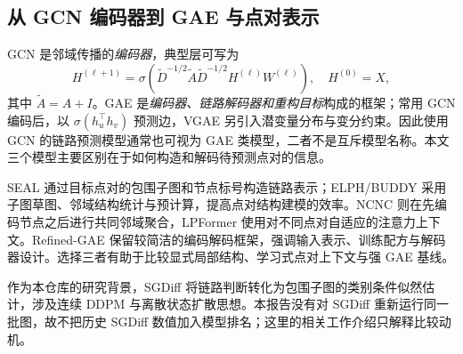 \subsection{从 GCN 编码器到 GAE 与点对表示}
GCN 是邻域传播的\emph{编码器}，典型层可写为
\begin{equation}
H^{(\ell+1)}=\sigma\!\left(\widetilde D^{-1/2}\widetilde A\widetilde D^{-1/2}H^{(\ell)}W^{(\ell)}\right),\quad H^{(0)}=X,
\end{equation}
其中 $\widetilde A=A+I$\cite{kipf2017gcn}。GAE 是\emph{编码器、链路解码器和重构目标}构成的框架；常用 GCN 编码后，以 $\sigma(h_u^\top h_v)$ 预测边，VGAE 另引入潜变量分布与变分约束\cite{kipf2016vgae}。因此使用 GCN 的链路预测模型通常也可视为 GAE 类模型，二者不是互斥模型名称。本文三个模型主要区别在于如何构造和解码待预测点对的信息。

SEAL 通过目标点对的包围子图和节点标号构造链路表示\cite{zhang2018seal}；ELPH/BUDDY 采用子图草图、邻域结构统计与预计算，提高点对结构建模的效率\cite{chamberlain2023buddy}。NCNC 则在先编码节点之后进行共同邻域聚合，LPFormer 使用对不同点对自适应的注意力上下文。Refined-GAE 保留较简洁的编码解码框架，强调输入表示、训练配方与解码器设计。选择三者有助于比较显式局部结构、学习式点对上下文与强 GAE 基线。

作为本仓库的研究背景，SGDiff 将链路判断转化为包围子图的类别条件似然估计\cite{li2025sgdiff}，涉及连续 DDPM 与离散状态扩散思想\cite{ho2020ddpm,austin2021d3pm}。本报告没有对 SGDiff 重新运行同一批图，故不把历史 SGDiff 数值加入模型排名；这里的相关工作介绍只解释比较动机。

